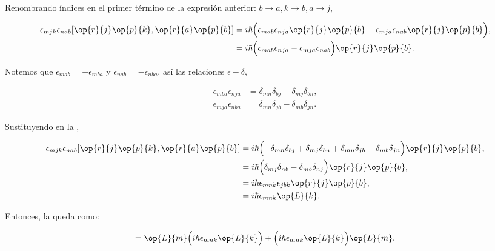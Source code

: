 \documentclass[../main.tex]{subfiles}
\begin{document}
\begin{problema}[10]
	Renombrando índices en el primer término de la expresión anterior:
	\(b \to a, k \to b, a \to j\),

	\begin{align}
		\epsilon_{mjk}\epsilon_{nab}[\op{r}{j}\op{p}{k}, \op{r}{a}\op{p}{b}] & =
		i\hbar \Bigl(\epsilon_{mab}\epsilon_{nja}\op{r}{j}\op{p}{b}
		- \epsilon_{mja}\epsilon_{nab}\op{r}{j}\op{p}{b}\Bigr),\nonumber                                                   \\
		                                                                     & = i\hbar \Bigl(\epsilon_{mab}\epsilon_{nja}
		- \epsilon_{mja}\epsilon_{nab}\Bigr)\op{r}{j}\op{p}{b}.
		\label{eq:commutator-rjpk-rapb}
	\end{align}

	\pagebreak
	Notemos que \(\epsilon_{mab} = - \epsilon_{mba}\) y \(\epsilon_{nab} = -\epsilon_{nba}\),
	así las relaciones \(\epsilon-\delta\),

	\begin{align*}
		\epsilon_{mba}\epsilon_{nja} & = \delta_{mn}\delta_{bj} - \delta_{mj}\delta_{bn}, \\
		\epsilon_{mja}\epsilon_{nba} & = \delta_{mn}\delta_{jb} - \delta_{mb}\delta_{jn}.
	\end{align*}

	Sustituyendo en la ,

	\begin{align*}
		\epsilon_{mjk}\epsilon_{nab}[\op{r}{j}\op{p}{k}, \op{r}{a}\op{p}{b}] & =
		i\hbar \Bigl(-\delta_{mn}\delta_{bj} + \delta_{mj}\delta_{bn} + \delta_{mn}\delta_{jb} - \delta_{mb}\delta_{jn}\Bigr)\op{r}{j}\op{p}{b},                       \\
		                                                                     & = i\hbar \Bigl(\delta_{mj}\delta_{nb} - \delta_{mb}\delta_{nj}\Bigr)\op{r}{j}\op{p}{b}, \\
		                                                                     & = i\hbar\epsilon_{mnk}\epsilon_{jbk}\op{r}{j}\op{p}{b},                                 \\
		                                                                     & = i\hbar\epsilon_{mnk}\op{L}{k}.
	\end{align*}

	Entonces, la  queda como:

	\begin{equation*}
		[\op{L}{}{2}, \op{L}{n}] = \op{L}{m}\Bigl(i\hbar\epsilon_{mnk}\op{L}{k}\Bigr) +
		\Bigl(i\hbar\epsilon_{mnk}\op{L}{k}\Bigr)\op{L}{m}.
	\end{equation*}


\end{problema}
\end{document}
